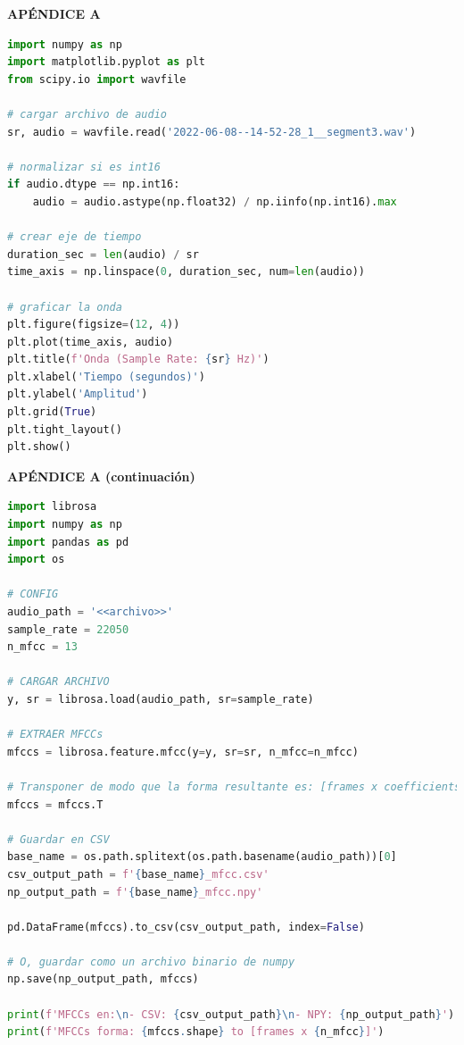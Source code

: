 \documentclass[12pt]{report}
\begin{document}
\pagebreak
{}
\printbibliography
\thispagestyle{empty}


\pagebreak
{}
\begin{center}
\large\textbf{APÉNDICE A}
\end{center}

\begin{lstlisting}[language=Python, caption={Visualización de la forma de onda de un archivo de audio.}, label={lst:waveform}]
import numpy as np
import matplotlib.pyplot as plt
from scipy.io import wavfile

# cargar archivo de audio
sr, audio = wavfile.read('2022-06-08--14-52-28_1__segment3.wav')

# normalizar si es int16
if audio.dtype == np.int16:
    audio = audio.astype(np.float32) / np.iinfo(np.int16).max

# crear eje de tiempo
duration_sec = len(audio) / sr
time_axis = np.linspace(0, duration_sec, num=len(audio))

# graficar la onda
plt.figure(figsize=(12, 4))
plt.plot(time_axis, audio)
plt.title(f'Onda (Sample Rate: {sr} Hz)')
plt.xlabel('Tiempo (segundos)')
plt.ylabel('Amplitud')
plt.grid(True)
plt.tight_layout()
plt.show()
\end{lstlisting}

\pagebreak
\begin{center}
\large\textbf{APÉNDICE A (continuación)}
\end{center}

\begin{lstlisting}[language=Python, caption={Prueba para extracción de características.}, label={lst:test_mfcc}]
import librosa
import numpy as np
import pandas as pd
import os

# CONFIG
audio_path = '<<archivo>>'
sample_rate = 22050
n_mfcc = 13

# CARGAR ARCHIVO
y, sr = librosa.load(audio_path, sr=sample_rate)

# EXTRAER MFCCs
mfccs = librosa.feature.mfcc(y=y, sr=sr, n_mfcc=n_mfcc)

# Transponer de modo que la forma resultante es: [frames x coefficients]
mfccs = mfccs.T

# Guardar en CSV
base_name = os.path.splitext(os.path.basename(audio_path))[0]
csv_output_path = f'{base_name}_mfcc.csv'
np_output_path = f'{base_name}_mfcc.npy'

pd.DataFrame(mfccs).to_csv(csv_output_path, index=False)

# O, guardar como un archivo binario de numpy
np.save(np_output_path, mfccs)

print(f'MFCCs en:\n- CSV: {csv_output_path}\n- NPY: {np_output_path}')
print(f'MFCCs forma: {mfccs.shape} to [frames x {n_mfcc}]')
\end{lstlisting}
\end{document}
